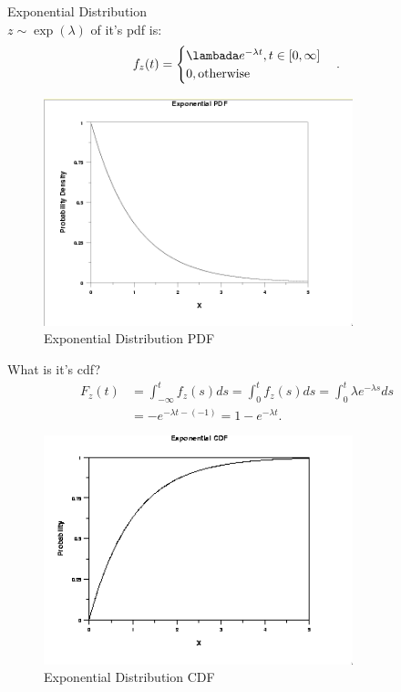 \documentclass[a4paper]{article}
\begin{document}
\begin{note}{Exponential Distribution} \\
  $z \sim \exp(\lambda)$ of it's pdf is: \\
  \[
  f_z (t) = \begin{cases}
    \lambada e^{-\lambda t}, t \in [0, \infty] \\
    0, \text{otherwise}
  \end{cases}
  .\] 

\begin{figure}[H]
  \centering
  \includegraphics[width=0.8\textwidth]{assets/2024-09-12-22-08-15.png}
  \caption{Exponential Distribution PDF}
  \label{fig:2024-09-12-22-08-15}
\end{figure}
  What is it's cdf?
  \begin{align*}
    F_z(t) &= \int_{-\infty}^t f_z(s) ds =  \int_{0}^t f_z(s) ds =  \int_{0}^t \lambda e^{-\lambda s} ds  \\ 
           &= -e^{-\lambda t - (-1)} = 1 - e^{-\lambda t} 
  .\end{align*}
\end{note}

\begin{figure}[h]
  \centering
  \includegraphics[width=0.8\textwidth]{assets/2024-09-12-22-14-13.png}
  \caption{Exponential Distribution CDF}
  \label{fig:2024-09-12-22-14-13}
\end{figure}
\end{document}

